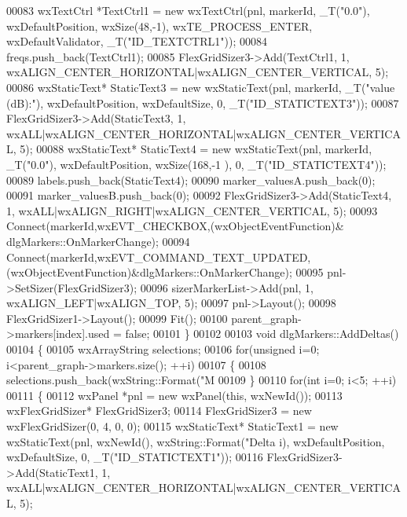 \begin{DoxyCode}
{{00083     wxTextCtrl *TextCtrl1 = \textcolor{keyword}{new} wxTextCtrl(pnl, markerId, _T(\textcolor{stringliteral}{"0.0"}), wxDefaultPosition, wxSize(48,-1), 
      wxTE\_PROCESS\_ENTER, wxDefaultValidator, _T(\textcolor{stringliteral}{"ID\_TEXTCTRL1"}));
00084     freqs.push\_back(TextCtrl1);
00085     FlexGridSizer3->Add(TextCtrl1, 1, wxALIGN\_CENTER\_HORIZONTAL|wxALIGN\_CENTER\_VERTICAL, 5);
00086     wxStaticText* StaticText3 = \textcolor{keyword}{new} wxStaticText(pnl, markerId, _T(\textcolor{stringliteral}{"value (dB):"}), wxDefaultPosition, 
      wxDefaultSize, 0, _T(\textcolor{stringliteral}{"ID\_STATICTEXT3"}));
00087     FlexGridSizer3->Add(StaticText3, 1, wxALL|wxALIGN\_CENTER\_HORIZONTAL|wxALIGN\_CENTER\_VERTICAL, 5);
00088     wxStaticText* StaticText4 = \textcolor{keyword}{new} wxStaticText(pnl, markerId, _T(\textcolor{stringliteral}{"0.0"}), wxDefaultPosition, wxSize(168,-1
      ), 0, _T(\textcolor{stringliteral}{"ID\_STATICTEXT4"}));
00089     labels.push\_back(StaticText4);
00090     marker_valuesA.push\_back(0);
00091     marker_valuesB.push\_back(0);
00092     FlexGridSizer3->Add(StaticText4, 1, wxALL|wxALIGN\_RIGHT|wxALIGN\_CENTER\_VERTICAL, 5);
00093     Connect(markerId,wxEVT\_CHECKBOX,(wxObjectEventFunction)&
      dlgMarkers::OnMarkerChange);
00094     Connect(markerId,wxEVT\_COMMAND\_TEXT\_UPDATED,(wxObjectEventFunction)&dlgMarkers::OnMarkerChange);
00095     pnl->SetSizer(FlexGridSizer3);
00096     sizerMarkerList->Add(pnl, 1, wxALIGN\_LEFT|wxALIGN\_TOP, 5);
00097     pnl->Layout();
00098     FlexGridSizer1->Layout();
00099     Fit();
00100     parent_graph->markers[index].used = \textcolor{keyword}{false};
00101 \}
00102 
00103 \textcolor{keywordtype}{void} dlgMarkers::AddDeltas()
00104 \{
00105     wxArrayString selections;
00106     \textcolor{keywordflow}{for}(\textcolor{keywordtype}{unsigned} i=0; i<parent_graph->markers.size(); ++i)
00107     \{
00108         selections.push\_back(wxString::Format(\textcolor{stringliteral}{"M%
00109     \}
00110     \textcolor{keywordflow}{for}(\textcolor{keywordtype}{int} i=0; i<5; ++i)
00111     \{
00112         wxPanel *pnl = \textcolor{keyword}{new} wxPanel(\textcolor{keyword}{this}, wxNewId());
00113         wxFlexGridSizer* FlexGridSizer3;
00114         FlexGridSizer3 = \textcolor{keyword}{new} wxFlexGridSizer(0, 4, 0, 0);
00115         wxStaticText* StaticText1 = \textcolor{keyword}{new} wxStaticText(pnl, wxNewId(), wxString::Format(\textcolor{stringliteral}{"Delta%
      i), wxDefaultPosition, wxDefaultSize, 0, _T(\textcolor{stringliteral}{"ID\_STATICTEXT1"}));
00116         FlexGridSizer3->Add(StaticText1, 1, wxALL|wxALIGN\_CENTER\_HORIZONTAL|wxALIGN\_CENTER\_VERTICAL, 5);
}}}}
\end{DoxyCode}
